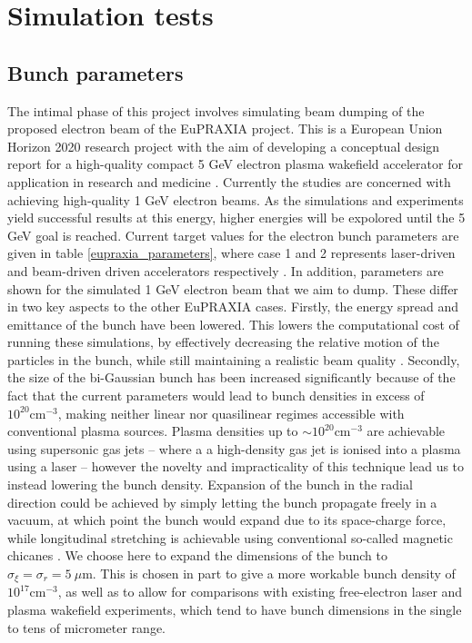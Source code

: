 \chapter{Simulation tests} %
\section{Bunch parameters}
The intimal phase of this project involves simulating beam dumping of the proposed electron beam of the EuPRAXIA project. This is a European Union Horizon 2020 research project with the aim of developing a conceptual design report for a high-quality compact 5 GeV electron plasma wakefield accelerator for application in research and medicine \cite{Eupraxia}. Currently the studies are concerned with achieving high-quality 1 GeV electron beams. As the simulations and experiments yield successful results at this energy, higher energies will be expolored until the 5 GeV goal is reached. Current target values for the electron bunch parameters are given in table \ref{eupraxia_parameters}, where case 1 and 2 represents laser-driven and beam-driven driven accelerators respectively \cite{Eupraxia}.  In addition, parameters are shown for the simulated 1 GeV electron beam that we aim to dump. These differ in two key aspects to the other EuPRAXIA cases. Firstly, the energy spread and emittance of the bunch have been lowered. This lowers the computational cost of running these simulations, by effectively decreasing the relative motion of the particles in the bunch, while still maintaining a realistic beam quality \cite{Walker2017}. Secondly, the size of the bi-Gaussian bunch has been increased significantly because of the fact that the current parameters would lead to bunch densities in excess of $10^{20} \text{cm}^{-3}$, making neither linear nor quasilinear regimes accessible with conventional plasma sources. Plasma densities up to $\sim 10^{20} \text{cm}^{-3}$ are achievable using supersonic gas jets \cite{Schmid2012} -- where a a high-density gas jet is ionised into a plasma using a laser -- however the novelty and impracticality of this technique lead us to instead lowering the bunch density. Expansion of the bunch in the radial direction could be achieved by simply letting the bunch propagate freely in a vacuum, at which point the bunch would expand due to its space-charge force, while longitudinal stretching is achievable using conventional so-called magnetic chicanes \cite{Maier2012}. We choose here to expand the dimensions of the bunch to $\sigma_{\xi}=\sigma_r=5~\mu\text{m}$. This is chosen in part to give a more workable bunch density of $10^{17} \text{cm}^{-3}$, as well as to allow for comparisons with existing free-electron laser and plasma wakefield experiments, which tend to have bunch dimensions in the single to tens of micrometer range. 


